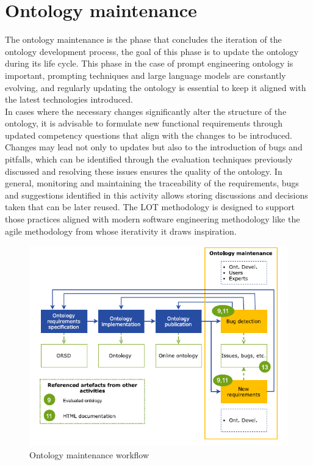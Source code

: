 \newpage
\section{Ontology maintenance}
The ontology maintenance is the phase that concludes the iteration of the ontology development process, the goal of this phase is to update the ontology during its life cycle. This phase in the case of prompt engineering ontology is important, prompting techniques and large language models are constantly evolving, and regularly updating the ontology is essential to keep it aligned with the latest technologies introduced.\\
In cases where the necessary changes significantly alter the structure of the ontology, it is advisable to formulate new functional requirements through updated competency questions that align with the changes to be introduced. Changes may lead not only to updates but also to the introduction of bugs and pitfalls, which can be identified through the evaluation techniques previously discussed and resolving these issues ensures the quality of the ontology. In general, monitoring and maintaining the traceability of the requirements, bugs and suggestions identified in this activity allows storing discussions and decisions taken that can be later reused. The LOT methodology is designed to support those practices aligned with modern software engineering methodology like the agile methodology from whose iterativity it draws inspiration.

\begin{figure}[H]
    \centering
    \includegraphics[width=0.9\linewidth]{Figures/fig_33.png}
    \caption{Ontology maintenance workflow}
    \label{fig:enter-label}
\end{figure}

